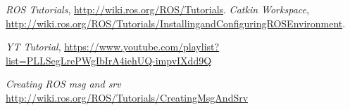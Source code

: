 \begin{thebibliography}{99}
    
 \textit{ROS Tutorials}, \url{http://wiki.ros.org/ROS/Tutorials}.
 \textit{Catkin Workspace}, \url{http://wiki.ros.org/ROS/Tutorials/InstallingandConfiguringROSEnvironment}.

 \textit{YT Tutorial}, \url{https://www.youtube.com/playlist?list=PLLSegLrePWgIbIrA4iehUQ-impvIXdd9Q}

 \textit{Creating ROS msg and srv} \url{http://wiki.ros.org/ROS/Tutorials/CreatingMsgAndSrv}
\end{thebibliography}